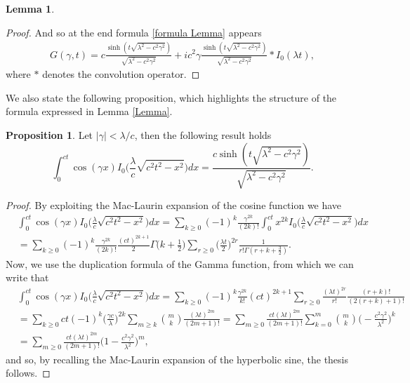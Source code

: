 \documentclass{article}
\theoremstyle{definition}
\newtheorem{proposition}{Proposition}[section]
\newtheorem{lemma}{Lemma}[section]
\numberwithin{equation}{section}
\begin{document}
\begin{lemma}
\begin{proof}
And so at the end formula \eqref{formula Lemma} appears
\begin{align*}
G(\gamma,t) = c\frac{\sinh{(t\sqrt{\lambda^2-c^2\gamma^2})}}{\sqrt{\lambda^2-c^2\gamma^2}} + ic^2\gamma\frac{\sinh(t\sqrt{\lambda^2-c^2\gamma^2})}{\sqrt{\lambda^2-c^2\gamma^2}} \ast I_0(\lambda t),
\end{align*}
where $*$ denotes the convolution operator.
\end{proof}
\end{lemma}
We also state the following proposition, which highlights the structure of the formula expressed in Lemma \ref{Lemma}.
\begin{proposition}
Let $|\gamma| <\lambda/c$, then the following result holds
\begin{equation}\label{Lemma 3}
\int_{0}^{ct}\cos(\gamma x)I_0\big(\frac{\lambda}{c}\sqrt{c^2t^2-x^2}\big)dx = \frac{c\sinh{(t\sqrt{\lambda^2-c^2\gamma^2})}}{\sqrt{\lambda^2-c^2\gamma^2}}.
\end{equation}
\end{proposition}
\begin{proof}
By exploiting the Mac-Laurin expansion of the cosine function we have 
\begin{align*}
&\int_{0}^{ct}\cos(\gamma x)I_0\big(\frac{\lambda}{c}\sqrt{c^2t^2-x^2}\big)dx = \sum_{k \geq 0}(-1)^k\frac{\gamma^{2k}}{(2k)!}\int_0^{ct}x^{2k}I_0\big(\frac{\lambda}{c}\sqrt{c^2t^2-x^2}\big)dx\\
&=\sum_{k \geq 0}(-1)^k\frac{\gamma^{2k}}{(2k)!}\frac{(ct)^{2k+1}}{2}\Gamma\Big(k+\frac{1}{2}\Big)\sum_{r\geq 0}\Big(\frac{\lambda t}{2}\Big)^{2r}\frac{1}{r!\Gamma(r+k+\frac{3}{2})}.
\end{align*}
Now, we use the duplication formula of the Gamma function, from which we can write that
\begin{align*}
&\int_{0}^{ct}\cos(\gamma x)I_0\big(\frac{\lambda}{c}\sqrt{c^2t^2-x^2}\big)dx=\sum_{k \geq 0}(-1)^k\frac{\gamma^{2k}}{k!}(ct)^{2k+1}\sum_{r\geq 0}\frac{(\lambda t)^{2r}}{r!}\frac{(r+k)!}{(2(r+k)+1)!}\\
&=\sum_{k \geq 0}ct(-1)^k\Big(\frac{\gamma c}{\lambda}\Big)^{2k}\sum_{m\geq k}\binom{m}{k}\frac{(\lambda t)^{2m}}{(2m+1)!}=\sum_{m\geq 0}\frac{ct(\lambda t)^{2m}}{(2m+1)!}\sum_{k=0}^m\binom{m}{k}\Big(-\frac{c^2\gamma^2}{\lambda^2}\Big)^{k}\\
&=\sum_{m\geq 0}\frac{ct(\lambda t)^{2m}}{(2m+1)!}\Big(1-\frac{c^2\gamma^2}{\lambda^2}\Big)^{m},
\end{align*}
and so, by recalling the Mac-Laurin expansion of the hyperbolic sine, the thesis follows. 
\end{proof}
\end{document}
